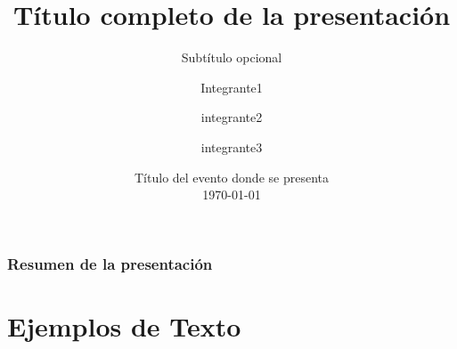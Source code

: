\documentclass[
	11pt, %
	aspectratio=169, %
]{beamer}
\title[Titulo Corto]{Título completo de la presentación} %
\subtitle{Subtítulo opcional} %
\author[Politecnico Grancolombiano]{Integrante1 \and integrante2 \and integrante3 }%
\date[\today]{Título del evento donde se presenta\\ \today} %
\begin{document}

\begin{frame}
	\titlepage %

\end{frame}



\begin{frame}
	\frametitle{Resumen de la presentación} %
	
	\tableofcontents %
\end{frame}


\section{Ejemplos de Texto} %
\end{document}
